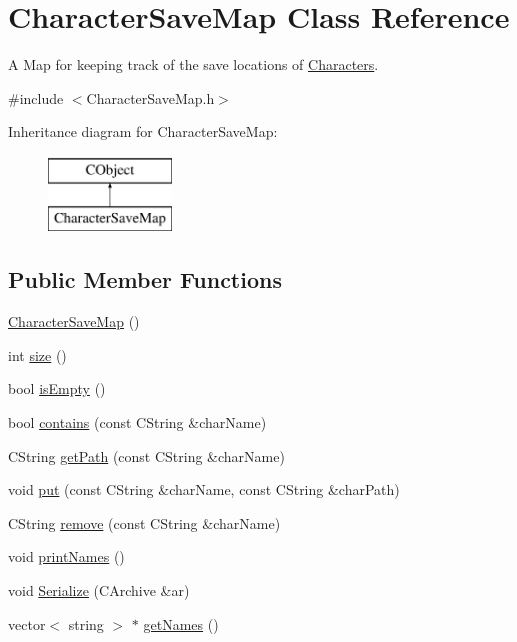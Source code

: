 \hypertarget{class_character_save_map}{}\section{Character\+Save\+Map Class Reference}
\label{class_character_save_map}


A Map for keeping track of the save locations of \hyperlink{class_characters}{Characters}.  




{\ttfamily \#include $<$Character\+Save\+Map.\+h$>$}

Inheritance diagram for Character\+Save\+Map\+:\begin{figure}[H]
\begin{center}
\leavevmode
\includegraphics[height=2.000000cm]{class_character_save_map}
\end{center}
\end{figure}
\subsection*{Public Member Functions}
\begin{DoxyCompactItemize}
\item 
\hyperlink{class_character_save_map_a1628139ff98a52d2341b6505d5bae1b0}{Character\+Save\+Map} ()
\item 
int \hyperlink{class_character_save_map_aa08505fbf7f84288fd9c21da0326bf49}{size} ()
\item 
bool \hyperlink{class_character_save_map_ab184ee82d93d3e907a582f1924f05990}{is\+Empty} ()
\item 
bool \hyperlink{class_character_save_map_ab139cd8a2bfb27da4a557689f32715b5}{contains} (const C\+String \&char\+Name)
\item 
C\+String \hyperlink{class_character_save_map_ae522be138bfeab45d12a255020150110}{get\+Path} (const C\+String \&char\+Name)
\item 
void \hyperlink{class_character_save_map_a1b0d8a748f717733e02ca01d2492fc80}{put} (const C\+String \&char\+Name, const C\+String \&char\+Path)
\item 
C\+String \hyperlink{class_character_save_map_a1daaac33e4d3550c29f6dd087d460209}{remove} (const C\+String \&char\+Name)
\item 
void \hyperlink{class_character_save_map_a4e62aa81be98017382c268a2e1165f09}{print\+Names} ()
\item 
void \hyperlink{class_character_save_map_a8470b5c25754acc6eb4761bedaed55d8}{Serialize} (C\+Archive \&ar)
\item 
vector$<$ string $>$ $\ast$ \hyperlink{class_character_save_map_a5b41ffbec363cf0c4bacc8411dcdfc90}{get\+Names} ()
\end{DoxyCompactItemize}
